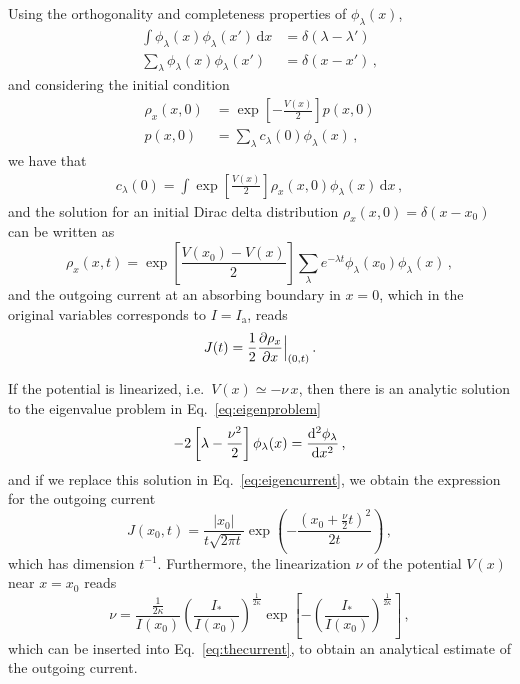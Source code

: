 {\begin{chapterappendices}
Using the orthogonality and completeness properties of $\phi_\lambda(x)$,
\begin{align}
    \int \phi_\lambda(x)\phi_\lambda(x')\,\mathrm{d}x &= \delta(\lambda - \lambda')\\
    \sum_\lambda \phi_\lambda(x)\phi_\lambda(x') &= \delta(x-x')\,,
\end{align}
and considering the initial condition
\begin{align}
    \rho_x(x,0) &= \exp\left[-\frac{V(x)}{2}\right] p(x,0) \\
    p(x,0) &= \sum_\lambda c_\lambda(0) \phi_\lambda(x)\,, \label{eq:mid_step_analytic}
\end{align}
we have that
\begin{align}
    c_\lambda(0) = \int \exp\left[\frac{V(x)}{2}\right] \rho_x(x,0)\phi_\lambda(x)\, \mathrm{d}x\,,
    \label{eq:c_lambda_zero}
\end{align}
and the solution for an initial Dirac delta distribution $\rho_x(x, 0)=\delta(x-x_0)$ can be written as
\begin{equation}
    \rho_x(x,t)=\exp\left[\frac{V(x_0)-V(x)}{2}\right]\sum_\lambda e^{-\lambda t}\phi_\lambda(x_0)\phi_\lambda(x)\, ,
\end{equation}
and the outgoing current at an absorbing boundary in $x=0$, which in the original variables corresponds to $I=I_\mathrm{a}$, reads
\begin{equation}
    J(t) = \frac{1}{2}\pdv{\rho_x}{x}\Bigr|_{(0,t)}     \, .
    \label{eq:eigencurrent}
\end{equation}

If the potential is linearized, i.e.\ $V(x)\simeq -\nu \, x$, then there is an analytic solution to the eigenvalue problem in Eq.~\eqref{eq:eigenproblem}
\begin{equation}
    -2\left[\lambda-\frac{\nu^2}{2}\right]\phi_\lambda(x)=\dv[2]{\phi_\lambda}{x}\, ,
\end{equation}
and if we replace this solution in Eq.~\eqref{eq:eigencurrent}, we obtain the expression for the outgoing current
\begin{equation}
    J(x_0, t) = \frac{|x_0|}{t\sqrt{2\pi t}}\exp\left(-\frac{(x_0+\frac{\nu}{2}t)^2}{2t}\right) \,,
    \label{eq:out_current}
\end{equation}
which has dimension $t^{-1}$. Furthermore, the linearization $\nu$ of the potential $V(x)$ near $x=x_0$ reads
\begin{equation}
    \nu=\frac{\frac{1}{2\kappa}}{I(x_0)}\left(\frac{I_\ast}{I(x_0)}\right)^{\frac{1}{2\kappa}}\exp\left[-\left(\frac{I_\ast}{I(x_0)}\right)^{\frac{1}{2\kappa}}\right]\,,
\end{equation}
which can be inserted into Eq.~\eqref{eq:thecurrent}, to obtain an analytical estimate of the outgoing current.


\end{chapterappendices}}
